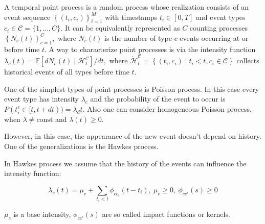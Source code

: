 \documentclass[10pt]{article}
\begin{document}





A temporal point process is a random process whose realization consists of an event sequence $\left\{\left(t_{i}, c_{i}\right)\right\}_{i=1}^{M}$ with timestamps $t_{i} \in[0, T]$ and event types $c_{i} \in \mathcal{C}=\{1, \ldots, C\} .$ It can be equivalently represented as $C$ counting processes $\left\{N_{c}(t)\right\}_{c=1}^{C},$ where $N_{c}(t)$ is the number of type-$c$ events occurring at or before time $t$. A way to characterize point processes is via the intensity function $\lambda_{c}(t)=\mathbb{E}\left[d N_{c}(t) \mid \mathcal{H}_{t}^{\mathcal{C}}\right] / d t,$ where $\dot{\mathcal{H}}_{t}^{\mathcal{C}}=\left\{\left(t_{i}, c_{i}\right) \mid t_{i}<t, c_{i} \in \mathcal{C}\right\}$ collects historical events of all types before time $t$.

One of the simplest types of point processes is Poisson process. In this case every event type has intensity $\lambda_c$ and the probability of the event to occur is $P(t_i^c \in [t,t+dt)) = \lambda_ dt$. Also one can consider homogeneous Poisson process, when $\lambda \neq \mathrm{const}$ and $\lambda(t) \geq 0$.

However, in this case, the appearance of the new event doesn't depend on history. One of the generalizations is the Hawkes process.

In Hawkes process we assume that the history of the events can influence the intensity function:

\begin{equation}
    \lambda_c(t) = \mu_c + \sum_{t_i<t} \phi_{cc_i}(t-t_i), ~ \mu_c \geq 0, ~ \phi_{cc'}(s) \geq 0
\end{equation}

$\mu_c$ is a base intensity, $\phi_{cc'}(s)$ are so called impact functions or kernels. 
\end{document}
